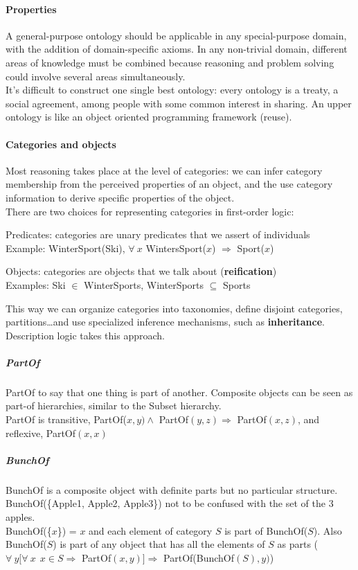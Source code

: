 \documentclass[10pt]{report}
\begin{document}
\paragraph{Properties} A general-purpose ontology should be applicable in any special-purpose domain, with the addition of domain-specific axioms. In any non-trivial domain, different areas of knowledge must be combined because reasoning and problem solving could involve several areas simultaneously.\\
It's difficult to construct one single best ontology: every ontology is a treaty, a social agreement, among people with some common interest in sharing. An upper ontology is like an object oriented programming framework (reuse).
\paragraph{Categories and objects} Most reasoning takes place at the level of categories: we can infer category membership from the perceived properties of an object, and the use category information to derive specific properties of the object.\\
There are two choices for representing categories in first-order logic:
\begin{list}{}{}
	\item Predicates: categories are unary predicates that we assert of individuals\\
	Example: WinterSport(Ski), $\forall\:x$ WintersSport($x$) $\Rightarrow$ Sport($x$)
	\item Objects: categories are objects that we talk about (\textbf{reification})\\
	Examples: Ski $\in$ WinterSports, WinterSports $\subseteq$ Sports
\end{list}
This way we can organize categories into taxonomies, define disjoint categories, partitions\ldots and use specialized inference mechanisms, such as \textbf{inheritance}. Description logic takes this approach.
\subparagraph{PartOf} PartOf to say that one thing is part of another. Composite objects can be seen as part-of hierarchies, similar to the Subset hierarchy.\\
PartOf is transitive, PartOf($x,y)\wedge$ PartOf$(y,z)\Rightarrow$ PartOf$(x,z)$, and reflexive, PartOf$(x,x)$
\subparagraph{BunchOf} BunchOf is a composite object with definite parts but no particular structure. BunchOf(\{Apple1, Apple2, Apple3\}) not to be confused with the set of the 3 apples.\\
BunchOf(\{$x$\}) = $x$ and each element of category $S$ is part of BunchOf($S$). Also BunchOf($S$) is part of any object that has all the elements of $S$ as parts ($\forall\:y[\forall\:x\:\:x\in S\Rightarrow$ PartOf$(x,y)]\Rightarrow$ PartOf(BunchOf$(S),y)$)
\end{document}
